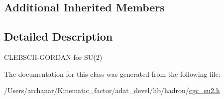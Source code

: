 \subsection*{Additional Inherited Members}


\subsection{Detailed Description}
C\+L\+E\+B\+S\+C\+H-\/\+G\+O\+R\+D\+AN for S\+U(2) 

The documentation for this class was generated from the following file\+:\begin{DoxyCompactItemize}
\item 
/\+Users/archanar/\+Kinematic\+\_\+factor/adat\+\_\+devel/lib/hadron/\mbox{\hyperlink{lib_2hadron_2cgc__su2_8h}{cgc\+\_\+su2.\+h}}\end{DoxyCompactItemize}
